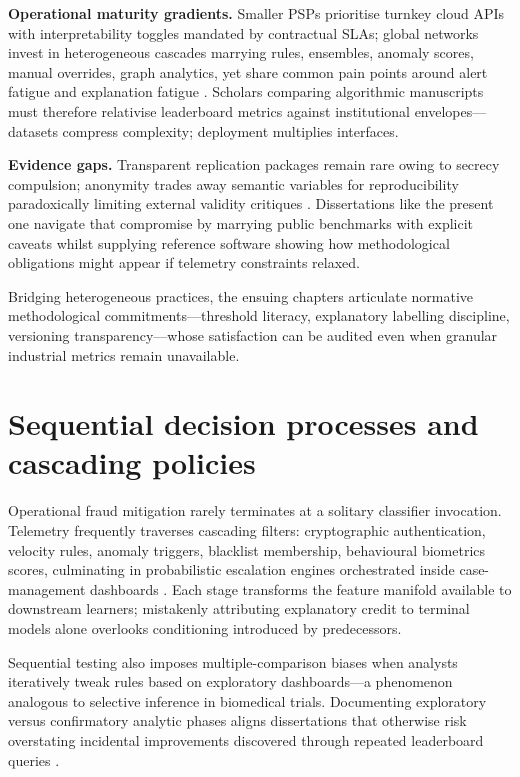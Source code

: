 \textbf{Operational maturity gradients.} Smaller PSPs prioritise turnkey cloud APIs with interpretability toggles mandated by contractual SLAs; global networks invest in heterogeneous cascades marrying rules, ensembles, anomaly scores, manual overrides, graph analytics, yet share common pain points around alert fatigue and explanation fatigue \cite{yousefi_fraud_survey2019}. Scholars comparing algorithmic manuscripts must therefore relativise leaderboard metrics against institutional envelopes—datasets compress complexity; deployment multiplies interfaces.

\textbf{Evidence gaps.} Transparent replication packages remain rare owing to secrecy compulsion; anonymity trades away semantic variables for reproducibility paradoxically limiting external validity critiques \cite{lucas_jurgovsky_ccfraud_survey2020}. Dissertations like the present one navigate that compromise by marrying public benchmarks with explicit caveats whilst supplying reference software showing how methodological obligations might appear if telemetry constraints relaxed.

Bridging heterogeneous practices, the ensuing chapters articulate normative methodological commitments—threshold literacy, explanatory labelling discipline, versioning transparency—whose satisfaction can be audited even when granular industrial metrics remain unavailable.

\section{Sequential decision processes and cascading policies}
Operational fraud mitigation rarely terminates at a solitary classifier invocation. Telemetry frequently traverses cascading filters: cryptographic authentication, velocity rules, anomaly triggers, blacklist membership, behavioural biometrics scores, culminating in probabilistic escalation engines orchestrated inside case-management dashboards \cite{fraud_handbook}. Each stage transforms the feature manifold available to downstream learners; mistakenly attributing explanatory credit to terminal models alone overlooks conditioning introduced by predecessors.

Sequential testing also imposes multiple-comparison biases when analysts iteratively tweak rules based on exploratory dashboards—a phenomenon analogous to selective inference in biomedical trials. Documenting exploratory versus confirmatory analytic phases aligns dissertations that otherwise risk overstating incidental improvements discovered through repeated leaderboard queries \cite{lucas_jurgovsky_ccfraud_survey2020}.

